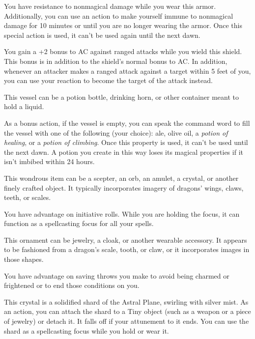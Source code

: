 \documentclass[10pt,a4paper,twoside,bg=print,twocolumn,openany,nodeprecatedcode]{dndbook}
\begin{document}
You have resistance to nonmagical damage while you wear this armor. Additionally, you can use an action to make yourself immune to nonmagical damage for 10 minutes or until you are no longer wearing the armor. Once this special action is used, it can't be used again until the next dawn.

You gain a +2 bonus to AC against ranged attacks while you wield this shield. This bonus is in addition to the shield's normal bonus to AC. In addition, whenever an attacker makes a ranged attack against a target within 5 feet of you, you can use your reaction to become the target of the attack instead.

This vessel can be a potion bottle, drinking horn, or other container meant to hold a liquid.

As a bonus action, if the vessel is empty, you can speak the command word to fill the vessel with one of the following (your choice): ale, olive oil, a \textit{potion of healing}, or a \textit{potion of climbing}. Once this property is used, it can't be used until the next dawn. A potion you create in this way loses its magical properties if it isn't imbibed within 24 hours.

This wondrous item can be a scepter, an orb, an amulet, a crystal, or another finely crafted object. It typically incorporates imagery of dragons' wings, claws, teeth, or scales.

You have advantage on initiative rolls. While you are holding the focus, it can function as a spellcasting focus for all your spells.

This ornament can be jewelry, a cloak, or another wearable accessory. It appears to be fashioned from a dragon's scale, tooth, or claw, or it incorporates images in those shapes.

You have advantage on saving throws you make to avoid being charmed or frightened or to end those conditions on you.

This crystal is a solidified shard of the Astral Plane, swirling with silver mist. As an action, you can attach the shard to a Tiny object (such as a weapon or a piece of jewelry) or detach it. It falls off if your attunement to it ends. You can use the shard as a spellcasting focus while you hold or wear it.
\end{document}
